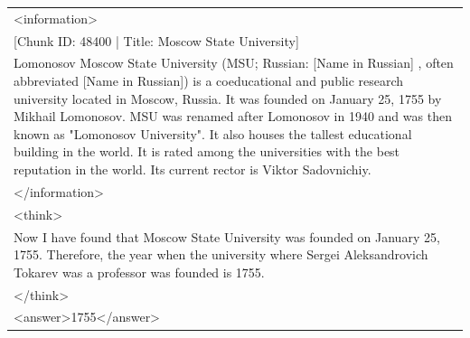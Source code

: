 \documentclass[11pt]{article}
\begin{document}
\begin{longtable}{|p{}|}
\textless{}information\textgreater{} \\
{[}Chunk ID: 48400 | Title: Moscow State University{]} \\
Lomonosov Moscow State University (MSU; Russian: [Name in Russian] , often abbreviated [Name in Russian]) is a coeducational and public research university located in Moscow, Russia. It was founded on January 25, 1755 by Mikhail Lomonosov. MSU was renamed after Lomonosov in 1940 and was then known as "Lomonosov University". It also houses the tallest educational building in the world. It is rated among the universities with the best reputation in the world. Its current rector is Viktor Sadovnichiy. \\
\textless{}/information\textgreater{} \\
\hline

\textless{}think\textgreater{} \\
Now I have found that Moscow State University was founded on January 25, 1755. Therefore, the year when the university where Sergei Aleksandrovich Tokarev was a professor was founded is 1755. \\
\textless{}/think\textgreater{} \\
\textless{}answer\textgreater{}1755\textless{}/answer\textgreater{} \\
\end{longtable}
\end{document}
